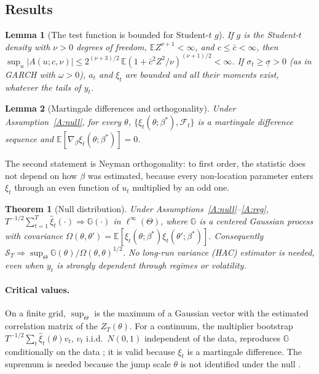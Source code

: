 \documentclass[11pt,a4paper]{article}
\newtheorem{theorem}{Theorem}
\newtheorem{lemma}{Lemma}
\theoremstyle{definition}
\theoremstyle{remark}
\newcommand{\E}{\mathbb{E}}
\newcommand{\F}{\mathcal{F}}
\begin{document}
\subsection{Results}
\begin{lemma}[The test function is bounded for Student-$t$ $g$]\label{lem:bounded}
If $g$ is the Student-$t$ density with $\nu>0$ degrees of freedom, $\E Z^{\nu+1}<\infty$, and $c\le\bar c<\infty$, then $\sup_u|A(u;c,\nu)|\le2^{(\nu+3)/2}\,\E(1+\bar c^2Z^2/\nu)^{(\nu+1)/2}<\infty$. If $\sigma_t\ge\underline\sigma>0$ (as in GARCH with $\omega>0$), $a_t$ and $\xi_t$ are bounded and all their moments exist, whatever the tails of $y_t$.
\end{lemma}


\begin{lemma}[Martingale differences and orthogonality]\label{lem:mds}
Under Assumption~\ref{A:null}, for every $\theta$, $\{\xi_t(\theta;\beta^*),\F_t\}$ is a martingale difference sequence and $\E[\nabla_\beta\xi_t(\theta;\beta^*)]=0$.
\end{lemma}

\noindent The second statement is Neyman orthogonality: to first order, the statistic does not depend on how $\beta$ was estimated, because every non-location parameter enters $\xi_t$ through an even function of $u_t$ multiplied by an odd one.

\begin{theorem}[Null distribution]\label{thm:null}
Under Assumptions~\ref{A:null}--\ref{A:reg}, $T^{-1/2}\sum_{t=1}^T\hat\xi_t(\cdot)\Rightarrow\mathbb G(\cdot)$ in $\ell^\infty(\Theta)$, where $\mathbb G$ is a centered Gaussian process with covariance $\Omega(\theta,\theta')=\E[\xi_t(\theta;\beta^*)\xi_t(\theta';\beta^*)]$. Consequently $\mathcal S_T\Rightarrow\sup_\Theta\mathbb G(\theta)/\Omega(\theta,\theta)^{1/2}$. No long-run variance (HAC) estimator is needed, even when $y_t$ is strongly dependent through regimes or volatility.
\end{theorem}


\paragraph{Critical values.} On a finite grid, $\sup_\Theta$ is the maximum of a Gaussian vector with the estimated correlation matrix of the $Z_T(\theta)$. For a continuum, the multiplier bootstrap $T^{-1/2}\sum_t\hat\xi_t(\theta)v_t$, $v_t$ i.i.d.\ $N(0,1)$ independent of the data, reproduces $\mathbb G$ conditionally on the data \citep{hansen1996}; it is valid because $\xi_t$ is a martingale difference. The supremum is needed because the jump scale $\theta$ is not identified under the null \citep{davies1977,davies1987,andrews1994ap,hansen1992}.
\end{document}
